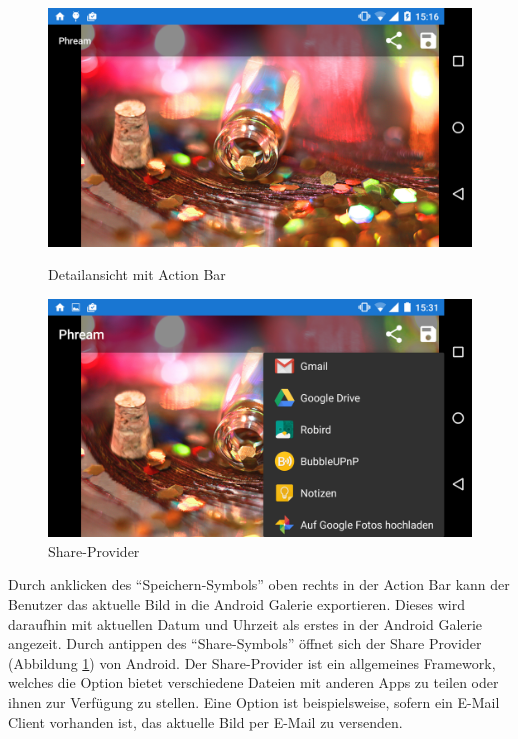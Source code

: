 \begin{figure}[H]
\centering
	\begin{minipage}{0.4\textwidth} 
	\centering
	\includegraphics[width=1\textwidth]{images/screenshots/fullscreenview_menu.png}
	\caption{Detailansicht mit Action Bar}
	\label{label:fullscreenview_menu}
	\end{minipage}
	\hfill
	\begin{minipage}{0.4\textwidth}
	\centering
	\includegraphics[width=1\textwidth]{images/screenshots/fullscreenview_share.png}
	\caption{Share-Provider}
	\label{label:fullscreenview_share}
	\end{minipage}
\end{figure}

Durch anklicken des \enquote{Speichern-Symbols} oben rechts in der Action Bar kann der Benutzer das aktuelle Bild in die Android Galerie exportieren. Dieses wird daraufhin mit aktuellen Datum und Uhrzeit als erstes in der Android Galerie angezeit. Durch antippen des \enquote{Share-Symbols} öffnet sich der Share Provider (Abbildung \ref{label:fullscreenview_share}) von Android. Der Share-Provider ist ein allgemeines Framework, welches die Option bietet verschiedene Dateien mit anderen Apps zu teilen oder ihnen zur Verfügung zu stellen. Eine Option ist beispielsweise, sofern ein E-Mail Client vorhanden ist, das aktuelle Bild per E-Mail zu versenden.

